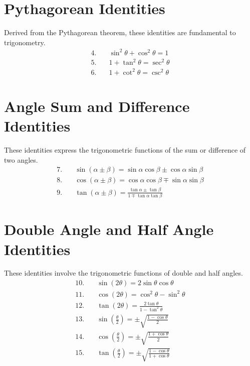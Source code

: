 \documentclass[a4paper,12pt]{book}
\begin{document}
\section*{Pythagorean Identities}
Derived from the Pythagorean theorem, these identities are fundamental to trigonometry.
\begin{align}
    4. \quad & \sin^2 \theta + \cos^2 \theta = 1 \\
    5. \quad & 1 + \tan^2 \theta = \sec^2 \theta \\
    6. \quad & 1 + \cot^2 \theta = \csc^2 \theta
\end{align}

\section*{Angle Sum and Difference Identities}
These identities express the trigonometric functions of the sum or difference of two angles.
\begin{align}
    7. \quad & \sin(\alpha \pm \beta) = \sin \alpha \cos \beta \pm \cos \alpha \sin \beta \\
    8. \quad & \cos(\alpha \pm \beta) = \cos \alpha \cos \beta \mp \sin \alpha \sin \beta \\
    9. \quad & \tan(\alpha \pm \beta) = \frac{\tan \alpha \pm \tan \beta}{1 \mp \tan \alpha \tan \beta}
\end{align}

\section*{Double Angle and Half Angle Identities}
These identities involve the trigonometric functions of double and half angles.
\begin{align}
    10. \quad & \sin(2\theta) = 2\sin \theta \cos \theta \\
    11. \quad & \cos(2\theta) = \cos^2 \theta - \sin^2 \theta \\
    12. \quad & \tan(2\theta) = \frac{2\tan \theta}{1 - \tan^2 \theta} \\
    13. \quad & \sin\left(\frac{\theta}{2}\right) = \pm\sqrt{\frac{1 - \cos \theta}{2}} \\
    14. \quad & \cos\left(\frac{\theta}{2}\right) = \pm\sqrt{\frac{1 + \cos \theta}{2}} \\
    15. \quad & \tan\left(\frac{\theta}{2}\right) = \pm\sqrt{\frac{1 - \cos \theta}{1 + \cos \theta}}
\end{align}
\end{document}
